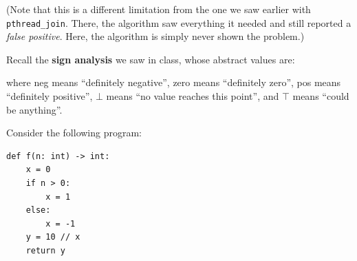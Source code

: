 \documentclass[addpoints]{exam}
\newcommand{\nonAnswerNewPage}{\ifprintanswers \vfill \else \newpage \fi}
\newcommand{\Neg}{\textsf{neg}}
\newcommand{\Zero}{\textsf{zero}}
\newcommand{\Pos}{\textsf{pos}}
\begin{document}
\begin{questions}
\begin{parts}
\begin{solutionorbox}[2.5in]
      (Note that this is a different limitation from the one we saw
      earlier with \texttt{pthread\_join}. There, the algorithm saw
      everything it needed and still reported a \emph{false positive}.
      Here, the algorithm is simply never shown the problem.)
    \end{solutionorbox}

  \end{parts}

  \nonAnswerNewPage

\question Recall the \textbf{sign analysis} we saw in class, whose
  abstract values are:

  \begin{center}
\end{center}

\noindent where \Neg{} means ``definitely negative'', \Zero{} means
  ``definitely zero'', \Pos{} means ``definitely positive'', $\bot$
  means ``no value reaches this point'', and $\top$ means ``could be
  anything''.

  Consider the following program:

\begin{verbatim}
def f(n: int) -> int:
    x = 0
    if n > 0:
        x = 1
    else:
        x = -1
    y = 10 // x
    return y
\end{verbatim}

\begin{parts}


\end{parts}
\end{questions}
\end{document}
